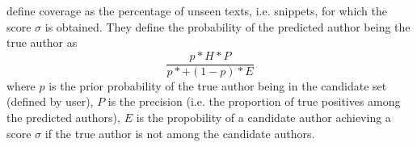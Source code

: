 \citet{koppel_authorship_2011} define coverage as the percentage of unseen texts, i.e. snippets, 
for which the score $\sigma$ is obtained.
They define the probability of the predicted author being the true author as 
$$\frac{p * H * P}{p * + (1-p) * E}$$
where $p$ is the prior probability of the true author being in the candidate set (defined by user),
$P$ is the precision (i.e. the proportion of true positives among the predicted authors),
$E$ is the propobility of a candidate author achieving a score $\sigma$ if the true author is not among the candidate authors.